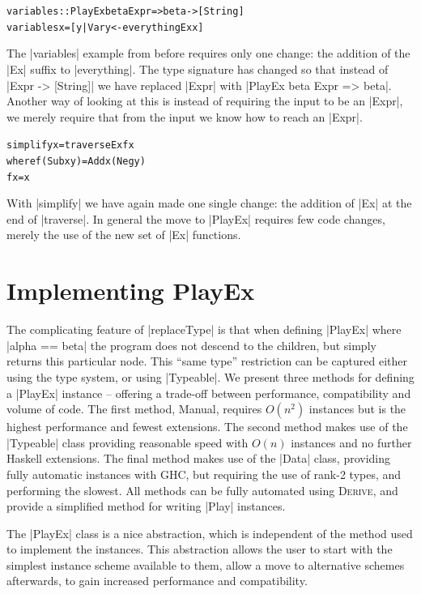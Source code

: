 \documentclass[preprint]{sigplanconf}
\newenvironment{code}{\begin{alltt}\small}{\end{alltt}}
\newcommand{\derive}{\textsc{Derive}}
\begin{document}
\begin{code}
variables :: PlayEx beta Expr => beta -> [String]
variables x = [y | Var y <- everythingEx x]
\end{code}

The |variables| example from before requires only one change: the addition of the |Ex| suffix to |everything|. The type signature has changed so that instead of |Expr -> [String]| we have replaced |Expr| with |PlayEx beta Expr => beta|. Another way of looking at this is instead of requiring the input to be an |Expr|, we merely require that from the input we know how to reach an |Expr|.

\begin{code}
simplify x = traverseEx f x
    where  f (Sub x y)  = Add x (Neg y)
           f x          = x
\end{code}

With |simplify| we have again made one single change: the addition of |Ex| at the end of |traverse|. In general the move to |PlayEx| requires few code changes, merely the use of the new set of |Ex| functions.

\section{Implementing PlayEx}
\label{sec:implement_playex}

The complicating feature of |replaceType| is that when defining |PlayEx| where |alpha == beta| the program does not descend to the children, but simply returns this particular node. This ``same type'' restriction can be captured either using the type system, or using |Typeable|. We present three methods for defining a |PlayEx| instance -- offering a trade-off between performance, compatibility and volume of code. The first method, Manual, requires $O(n^2)$ instances but is the highest performance and fewest extensions. The second method makes use of the |Typeable| class providing reasonable speed with $O(n)$ instances and no further Haskell extensions. The final method makes use of the |Data| class, providing fully automatic instances with GHC, but requiring the use of rank-2 types, and performing the slowest. All methods can be fully automated using \derive{}, and provide a simplified method for writing |Play| instances.

The |PlayEx| class is a nice abstraction, which is independent of the method used to implement the instances. This abstraction allows the user to start with the simplest instance scheme available to them, allow a move to alternative schemes afterwards, to gain increased performance and compatibility.
\end{document}
